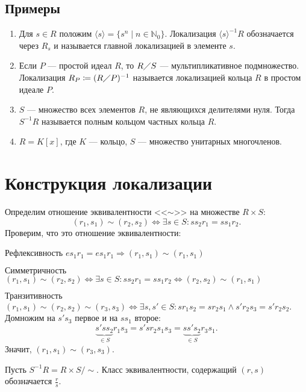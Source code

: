 \documentclass[11pt]{book}
\newcommand{\N}{\mathbb{N}}
\newcommand{\po}{\diagup}
\theoremstyle{definition}
\theoremstyle{plain}
\theoremstyle{plain}
\theoremstyle{definition}
\theoremstyle{remark}
\begin{document}
\subsection{Примеры}
\begin{enumerate}
    \item Для $ s \in R$ положим $ \langle s \rangle = \{s^{n} \mid n \in \N_0\}$. Локализация $ \langle s \rangle^{-1} R $ обозначается через $ R_s$ и называется {\sf главной локализацией в элементе $ s$}.  
    \item Если $ P$ --- простой идеал  $ R$, то  $ R \po S$ --- мультипликативное подмножество. 
	Локализация  $ R_{P} \coloneqq (R \po P)^{-1}$ называется {\sf локализацией кольца $ R$ в простом идеале  $ P$}.
    \item  $ S$ --- множество всех элементов   $ R$, не являющихся делителями нуля. Тогда  $ S^{-1}R$ называется {\sf полным кольцом частных кольца $ R$}.
    \item  $ R = K[x]$, где  $ K$ --- кольцо,  $ S$ --- множество унитарных многочленов.
\end{enumerate}
\section{Конструкция локализации}
Определим отношение эквивалентности <<$ \sim $>> на множестве $ R \times S$:
\[
    (r_1, s_1) \sim (r_2, s_2) \Longleftrightarrow \exists s \in  S: ss_2r_1 = ss_1r_2
.\]
Проверим, что это отношение эквивалентности:
\begin{description}
    \item $ \boxed{\text{Рефлексивность}}$ $ e s_1r_1 = e s_1r_1 \Longrightarrow (r_1, s_1) \sim (r_1, s_1)$
    \item $ \boxed{\text{Симметричность}}$ $ (r_1, s_1) \sim (r_2, s_2) \Longleftrightarrow \exists s \in S: ss_2r_1 = ss_1r_2 \Longleftrightarrow (r_2, s_2) \sim (r_1, s_1)$
    \item $ \boxed{\text{Транзитивность}}$  $ (r_1, s_1) \sim (r_2 , s_2) \sim (r_3, s_3) \Longleftrightarrow \exists s, s' \in S: s r_1 s_2 = s r_2 s_1 \wedge s'r_2 s_3 = s' r_2s_2$. Домножим на $ s's_3$ первое и на $ ss_1$ второе:
	\[
	    \underbrace{s'ss_2}_{\in S}r_1s_3 = s's r_2 s_1 s_3 = \underbrace{s s' s_2}_{ \in S} r_3 s_1
	.\]
	Значит, $ (r_1, s_1) \sim (r_3, s_3)$.
\end{description}
Пусть $ S^{-1}R = R \times S / \sim $.  Класс эквивалентности, содержащий $ (r, s)$ обозначается  $ \frac{r}{s}$.
\end{document}
